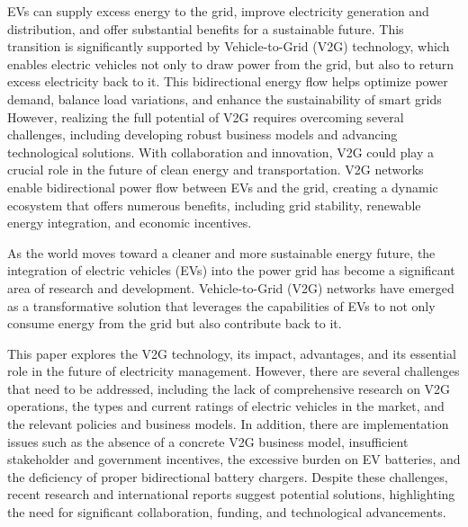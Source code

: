 \documentclass[3p,times,onecolumn]{elsarticle}
\begin{document}
EVs can supply excess energy to the grid, improve electricity generation and distribution, and offer substantial benefits for a sustainable future. This transition is significantly supported by Vehicle-to-Grid (V2G) technology, which enables electric vehicles not only to draw power from the grid, but also to return excess electricity back to it. This bidirectional energy flow helps optimize power demand, balance load variations, and enhance the sustainability of smart grids\cite{GT5} However, realizing the full potential of V2G requires overcoming several challenges, including developing robust business models and advancing technological solutions. With collaboration and innovation, V2G could play a crucial role in the future of clean energy and transportation. V2G networks enable bidirectional power flow between EVs and the grid, creating a dynamic ecosystem that offers numerous benefits, including grid stability, renewable energy integration, and economic incentives.  


As the world moves toward a cleaner and more sustainable energy future, the integration of electric vehicles (EVs) into the power grid has become a significant area of research and development. Vehicle-to-Grid (V2G) networks have emerged as a transformative solution that leverages the capabilities of EVs to not only consume energy from the grid but also contribute back to it.

This paper explores the V2G technology, its impact, advantages, and its essential role in the future of electricity management. However, there are several challenges that need to be addressed, including the lack of comprehensive research on V2G operations, the types and current ratings of electric vehicles in the market, and the relevant policies and business models. In addition, there are implementation issues such as the absence of a concrete V2G business model, insufficient stakeholder and government incentives, the excessive burden on EV batteries, and the deficiency of proper bidirectional battery chargers. Despite these challenges, recent research and international reports suggest potential solutions, highlighting the need for significant collaboration, funding, and technological advancements.
\end{document}
